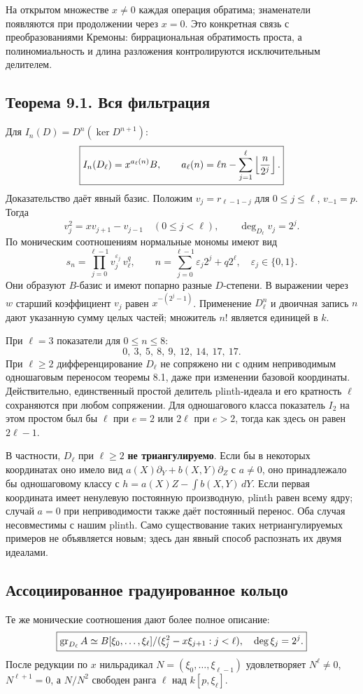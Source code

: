 На открытом множестве $x\ne0$ каждая операция обратима; знаменатели появляются при продолжении через $x=0$. Это конкретная связь с преобразованиями Кремоны: биррациональная обратимость проста, а полиномиальность и длина разложения контролируются исключительным делителем.

\subsection*{Теорема 9.1. Вся фильтрация}
Для $I_n(D)=D^n(\ker D^{n+1})$:
\[
\boxed{I_n(D_\ell)=x^{a_\ell(n)}B,\qquad
a_\ell(n)=\ell n-\sum_{j=1}^{\ell}\left\lfloor\frac n{2^j}\right\rfloor.}
\]
Доказательство даёт явный базис. Положим $v_j=r_{\ell-1-j}$ для $0\le j\le\ell$, $v_{-1}=p$. Тогда
\[
v_j^2=xv_{j+1}-v_{j-1}\quad(0\le j<\ell),\qquad \deg_{D_\ell}v_j=2^j.
\]
По моническим соотношениям нормальные мономы имеют вид
\[
s_n=\prod_{j=0}^{\ell-1}v_j^{\varepsilon_j}\,v_\ell^q,
\qquad n=\sum_{j=0}^{\ell-1}\varepsilon_j2^j+q2^\ell,
\quad\varepsilon_j\in\{0,1\}.
\]
Они образуют $B$-базис и имеют попарно разные $D$-степени. В выражении через $w$ старший коэффициент $v_j$ равен $x^{-(2^j-1)}$. Применение $D_\ell^n$ и двоичная запись $n$ дают указанную сумму целых частей; множитель $n!$ является единицей в $k$.

При $\ell=3$ показатели для $0\le n\le8$:
\[
0,\ 3,\ 5,\ 8,\ 9,\ 12,\ 14,\ 17,\ 17.
\]
При $\ell\ge2$ дифференцирование $D_\ell$ не сопряжено ни с одним неприводимым одношаговым переносом теоремы 8.1, даже при изменении базовой координаты. Действительно, единственный простой делитель plinth-идеала и его кратность $\ell$ сохраняются при любом сопряжении. Для одношагового класса показатель $I_2$ на этом простом был бы $\ell$ при $e=2$ или $2\ell$ при $e>2$, тогда как здесь он равен $2\ell-1$.

В частности, $D_\ell$ при $\ell\ge2$ \textbf{не триангулируемо}. Если бы в некоторых координатах оно имело вид $a(X)\partial_Y+b(X,Y)\partial_Z$ с $a\ne0$, оно принадлежало бы одношаговому классу с $h=a(X)Z-\int b(X,Y)\,dY$. Если первая координата имеет ненулевую постоянную производную, plinth равен всему ядру; случай $a=0$ при неприводимости также даёт постоянный перенос. Оба случая несовместимы с нашим plinth. Само существование таких нетриангулируемых примеров не объявляется новым; здесь дан явный способ распознать их двумя идеалами.

\subsection*{Ассоциированное градуированное кольцо}
Те же монические соотношения дают более полное описание:
\[
\boxed{\operatorname{gr}_{D_\ell}A\simeq
B[\xi_0,\ldots,\xi_\ell]/(\xi_j^2-x\xi_{j+1}:j<\ell),\quad
\deg\xi_j=2^j.}
\]
После редукции по $x$ нильрадикал $N=(\xi_0,\ldots,\xi_{\ell-1})$ удовлетворяет $N^\ell\ne0$, $N^{\ell+1}=0$, а $N/N^2$ свободен ранга $\ell$ над $k[p,\xi_\ell]$.


